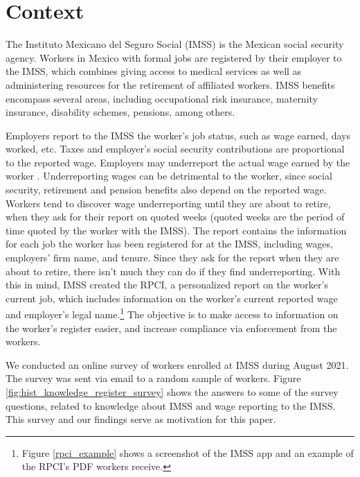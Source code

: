 \documentclass[oneside,11pt]{article}
\begin{document}
\section{Context} \label{context}

The Instituto Mexicano del Seguro Social (IMSS) is the Mexican social security agency. Workers in Mexico with formal jobs are registered by their employer to the IMSS, which combines giving access to medical services as well as administering resources for the retirement of affiliated workers. IMSS benefits encompass several areas, including occupational risk insurance, maternity insurance, disability schemes, pensions, among others.

Employers report to the IMSS the worker's job status, such as wage earned, days worked, etc. Taxes and employer's social security contributions are proportional to the reported wage. Employers may underreport the actual wage earned by the worker \citep{kumler2020enlisting}. Underreporting wages can be detrimental to the worker, since social security, retirement and pension benefits also depend on the reported wage. Workers tend to discover wage underreporting until they are about to retire, when they ask for their report on quoted weeks (quoted weeks are the period of time quoted by the worker with the IMSS). The report contains the information for each job the worker has been registered for at the IMSS, including wages, employers' firm name, and tenure. Since they ask for the report when they are about to retire, there isn't much they can do if they find underreporting. With this in mind, IMSS created the RPCI, a personalized report on the worker's current job, which includes information on the worker's current reported wage and employer's legal name.\footnote{Figure \ref{rpci_example} shows a screenshot of the IMSS app and an example of the RPCI's PDF workers receive.} The objective is to make access to information on the worker's register easier, and increase compliance via enforcement from the workers.

We conducted an online survey of workers enrolled at IMSS during August 2021. The survey was sent via email to a random sample of workers. Figure \ref{fig:hist_knowledge_register_survey} shows the answers to some of the survey questions, related to knowledge about IMSS and wage reporting to the IMSS. This survey and our findings serve as motivation for this paper.
\end{document}
